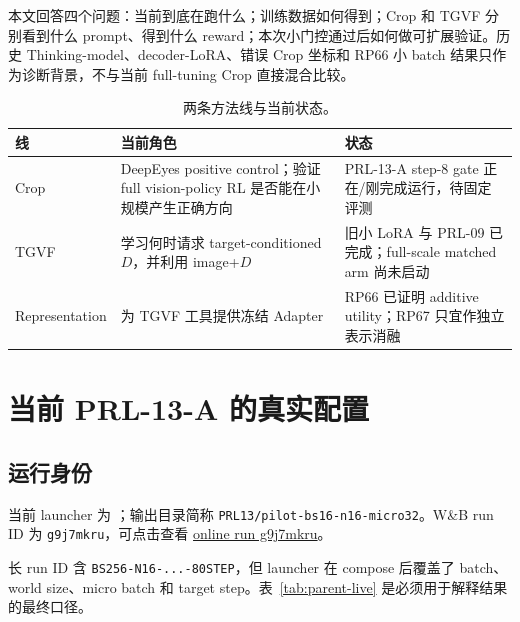 \documentclass[UTF8,twocolumn,10pt,a4paper]{ctexart}
\newcommand{\TGVF}{\textsf{TGVF}}
\newcommand{\code}[1]{\texttt{#1}}
\begin{document}
本文回答四个问题：当前到底在跑什么；训练数据如何得到；Crop 和 \TGVF{} 分别看到什么 prompt、得到什么 reward；本次小门控通过后如何做可扩展验证。历史 Thinking-model、decoder-LoRA、错误 Crop 坐标和 RP66 小 batch 结果只作为诊断背景，不与当前 full-tuning Crop 直接混合比较。

\begin{table}[t]
\centering
\caption{两条方法线与当前状态。}
\label{tab:lines}
\small
\begin{tabularx}{\columnwidth}{lYY}
\toprule
线 & 当前角色 & 状态 \\
\midrule
Crop & DeepEyes positive control；验证 full vision-policy RL 是否能在小规模产生正确方向 & PRL-13-A step-8 gate 正在/刚完成运行，待固定评测 \\
\TGVF{} & 学习何时请求 target-conditioned $D$，并利用 image+$D$ & 旧小 LoRA 与 PRL-09 已完成；full-scale matched arm 尚未启动 \\
Representation & 为 \TGVF{} 工具提供冻结 Adapter & RP66 已证明 additive utility；RP67 只宜作独立表示消融 \\
\bottomrule
\end{tabularx}
\end{table}

\section{当前 PRL-13-A 的真实配置}

\subsection{运行身份}

当前 launcher 为 ；输出目录简称 \code{PRL13/pilot-bs16-n16-micro32}。W\&B run ID 为 \code{g9j7mkru}，可点击查看
\href{https://wandb.ai/mio_nora/tgvf-policy-rl/runs/g9j7mkru}{online run g9j7mkru}。

长 run ID 含 \code{BS256-N16-...-80STEP}，但 launcher 在 compose 后覆盖了 batch、world size、micro batch 和 target step。表~\ref{tab:parent-live} 是必须用于解释结果的最终口径。
\end{document}
